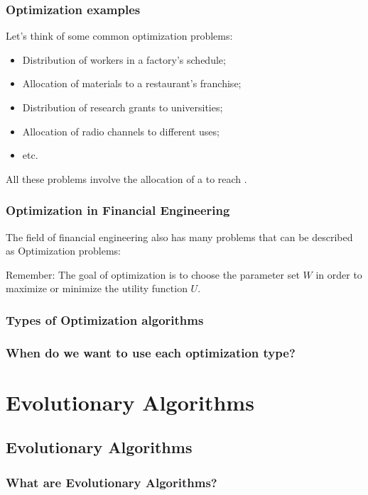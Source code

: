 \documentclass{beamer}[10pt]
\begin{document}
\begin{frame}
  \frametitle{Optimization examples}
  Let's think of some common optimization problems:
  \begin{itemize}
    \item Distribution of workers in a factory's schedule;
    \item Allocation of materials to a restaurant's franchise;
    \item Distribution of research grants to universities;
    \item Allocation of radio channels to different uses;
    \item etc.
  \end{itemize}
  \medskip
  All these problems involve the allocation of a 
  to reach .
\end{frame}

\begin{frame}
  \frametitle{Optimization in Financial Engineering} 
  The field of financial engineering also has many problems that can
  be described as Optimization problems:


  \begin{block}{Remember:}
    The goal of optimization is to choose the parameter set $W$ in
    order to maximize or minimize the utility function $U$.
  \end{block}
\end{frame}

\begin{frame}
  \frametitle{Types of Optimization algorithms}
\end{frame}

\begin{frame}
  \frametitle{When do we want to use each optimization type?}
\end{frame}


\section{Evolutionary Algorithms}
\subsection{Evolutionary Algorithms}
\begin{frame}
  \frametitle{What are Evolutionary Algorithms?}
\end{frame}
\end{document}
